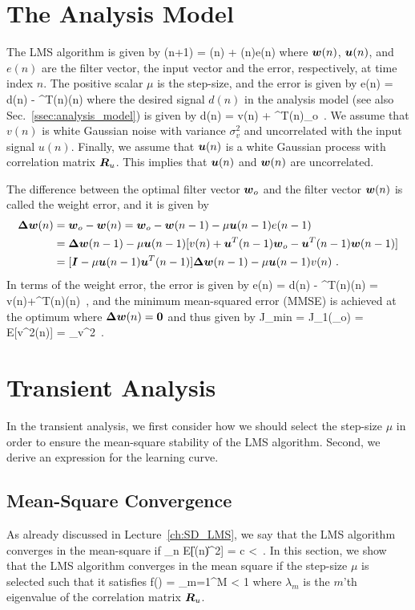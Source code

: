\section{The Analysis Model}
The LMS algorithm is given by
\bmath
  (n+1) = (n) + \mu{}(n)e(n)
\emath
where $\boldsymbol{w}(n)$, $\boldsymbol{u}(n)$, and $e(n)$ are the filter vector, the input vector and the error, respectively, at time index $n$. The positive scalar $\mu$ is the step-size, and the error is given by
\bmath
  e(n) = d(n) - ^T(n)(n)
\emath
where the desired signal $d(n)$ in the analysis model (see also Sec.~\ref{ssec:analysis_model}) is given by
\bmath
  d(n) = v(n) + ^T(n)_o\ .
\emath
We assume that $v(n)$ is white Gaussian noise with variance $\sigma_v^2$ and uncorrelated with the input signal $u(n)$. Finally, we assume that $\boldsymbol{u}(n)$ is a white Gaussian process with correlation matrix $\boldsymbol{R}_u$. This implies that $\boldsymbol{u}(n)$ and $\boldsymbol{w}(n)$ are uncorrelated.

The difference between the optimal filter vector $\boldsymbol{w}_o$ and the filter vector $\boldsymbol{w}(n)$ is called the weight error, and it is given by
\begin{align}
  \vect{\Delta}\vect{w}(n) &= \vect{w}_o-\vect{w}(n) = \vect{w}_o - \vect{w}(n-1) - \mu\vect{u}(n-1)e(n-1)\\
  &= \vect{\Delta}\vect{w}(n-1) - \mu \vect{u}(n-1)[v(n)+\vect{u}^T(n-1)\vect{w}_o-\vect{u}^T(n-1)\vect{w}(n-1)]\\
  &= [\vect{I}-\mu\vect{u}(n-1)\vect{u}^T(n-1)]\vect{\Delta}\vect{w}(n-1)-\mu\vect{u}(n-1)v(n)\ .
 \label{app:lms_weight_error}
\end{align}
In terms of the weight error, the error is given by
\bmath
  e(n) = d(n) - ^T(n)(n) = v(n)+^T(n)\vect{\Delta}(n)\ ,
\emath
and the minimum mean-squared error (MMSE) is achieved at the optimum where $\boldsymbol{\Delta}\boldsymbol{w}(n)=\boldsymbol{0}$ and thus given by
\bmath
  J_\textup{min} = J_1(_o) = E[v^2(n)] = \sigma_v^2\ .
\emath

\section{Transient Analysis}
In the transient analysis, we first consider how we should select the step-size $\mu$ in order to ensure the mean-square stability of the LMS algorithm. Second, we derive an expression for the learning curve.

\subsection{Mean-Square Convergence}
As already discussed in Lecture~\ref{ch:SD_LMS}, we say that the LMS algorithm converges in the mean-square if
\bmath
  \lim_{n\to\infty} E[\|(n)\|^2] = c <\infty\ .
\emath
In this section, we show that the LMS algorithm converges in the mean square if the step-size $\mu$ is selected such that it satisfies
\bmath
  f(\mu) = \sum_{m=1}^M  < 1
\emath
where $\lambda_m$ is the $m$'th eigenvalue of the correlation matrix $\boldsymbol{R}_u$. 

